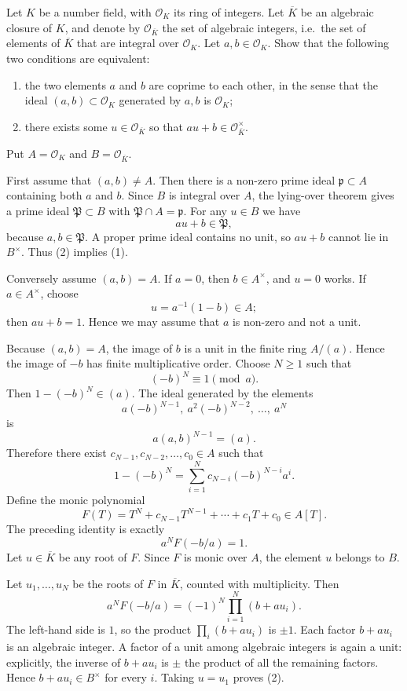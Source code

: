 \begin{exercise}
\label{algebra:2026:3}
Let $K$ be a number field, with $\mathcal{O}_K$ its ring of integers. Let $\overline K$ be an algebraic closure of $K$, and denote by $\mathcal{O}_{\overline K}$ the set of algebraic integers, i.e.\ the set of elements of $\overline K$ that are integral over $\mathcal{O}_K$. Let $a,b\in \mathcal{O}_K$. Show that the following two conditions are equivalent:
\begin{enumerate}
\item[(1)] the two elements $a$ and $b$ are coprime to each other, in the sense that the ideal $(a,b)\subset \mathcal{O}_K$ generated by $a,b$ is $\mathcal{O}_K$;
\item[(2)] there exists some $u\in \mathcal{O}_{\overline K}$ so that $au+b\in \mathcal{O}_{\overline K}^{\times}$.
\end{enumerate}
\end{exercise}

\begin{solution}
Put $A=\mathcal{O}_K$ and $B=\mathcal{O}_{\overline K}$.

First assume that $(a,b)\ne A$. Then there is a non-zero prime ideal $\mathfrak p\subset A$ containing both $a$ and $b$. Since $B$ is integral over $A$, the lying-over theorem gives a prime ideal $\mathfrak P\subset B$ with $\mathfrak P\cap A=\mathfrak p$. For any $u\in B$ we have
\[
au+b\in \mathfrak P,
\]
because $a,b\in \mathfrak P$. A proper prime ideal contains no unit, so $au+b$ cannot lie in $B^\times$. Thus (2) implies (1).

Conversely assume $(a,b)=A$. If $a=0$, then $b\in A^\times$, and $u=0$ works. If $a\in A^\times$, choose
\[
u=a^{-1}(1-b)\in A;
\]
then $au+b=1$. Hence we may assume that $a$ is non-zero and not a unit.

Because $(a,b)=A$, the image of $b$ is a unit in the finite ring $A/(a)$. Hence the image of $-b$ has finite multiplicative order. Choose $N\geq 1$ such that
\[
(-b)^N\equiv 1\pmod a.
\]
Then $1-(-b)^N\in (a)$. The ideal generated by the elements
\[
a(-b)^{N-1},\ a^2(-b)^{N-2},\ \ldots,\ a^N
\]
is
\[
a(a,b)^{N-1}=(a).
\]
Therefore there exist $c_{N-1},c_{N-2},\ldots,c_0\in A$ such that
\[
1-(-b)^N
=
\sum_{i=1}^N c_{N-i}(-b)^{N-i}a^i.
\]
Define the monic polynomial
\[
F(T)=T^N+c_{N-1}T^{N-1}+\cdots+c_1T+c_0\in A[T].
\]
The preceding identity is exactly
\[
a^N F(-b/a)=1.
\]
Let $u\in \overline K$ be any root of $F$. Since $F$ is monic over $A$, the element $u$ belongs to $B$.

Let $u_1,\ldots,u_N$ be the roots of $F$ in $\overline K$, counted with multiplicity. Then
\[
a^N F(-b/a)
=
(-1)^N\prod_{i=1}^N (b+au_i).
\]
The left-hand side is $1$, so the product $\prod_i(b+au_i)$ is $\pm 1$. Each factor $b+au_i$ is an algebraic integer. A factor of a unit among algebraic integers is again a unit: explicitly, the inverse of $b+au_i$ is $\pm$ the product of all the remaining factors. Hence $b+au_i\in B^\times$ for every $i$. Taking $u=u_1$ proves (2).
\end{solution}

